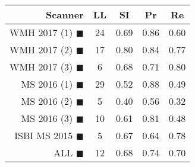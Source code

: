 \begin{tabular}{rcccc}
\toprule
Scanner & LL & SI & Pr & Re \\
\midrule
WMH 2017 (1) {\color[rgb]{ 1.00 0.00 0.00}$\blacksquare$} & 24 & 0.69 & 0.86 & 0.60 \\
WMH 2017 (2) {\color[rgb]{ 1.00 0.50 0.00}$\blacksquare$} & 17 & 0.80 & 0.84 & 0.77 \\
WMH 2017 (3) {\color[rgb]{ 1.00 0.80 0.00}$\blacksquare$} & 6 & 0.68 & 0.71 & 0.80 \\
MS  2016 (1) {\color[rgb]{ 0.20 0.80 0.00}$\blacksquare$} & 29 & 0.52 & 0.88 & 0.49 \\
MS  2016 (2) {\color[rgb]{ 0.00 0.40 1.00}$\blacksquare$} & 5 & 0.40 & 0.56 & 0.32 \\
MS  2016 (3) {\color[rgb]{ 0.60 0.00 1.00}$\blacksquare$} & 10 & 0.61 & 0.81 & 0.48 \\
ISBI MS 2015 {\color[rgb]{ 1.00 0.00 1.00}$\blacksquare$} & 5 & 0.67 & 0.64 & 0.78 \\
\midrule
ALL {\color[rgb]{ 1.00 1.00 1.00}$\blacksquare$} & 12 & 0.68 & 0.74 & 0.70 \\
\bottomrule
\end{tabular}